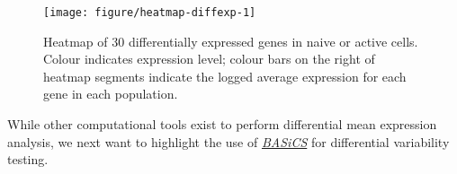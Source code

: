 \documentclass[9pt,a4paper,]{extarticle}
\begin{document}
\begin{figure}

{\centering \texttt{[image: figure/heatmap-diffexp-1]} 

}

\caption{Heatmap of 30 differentially expressed genes in naive or active cells. Colour indicates expression level; colour bars on the right of heatmap segments indicate the logged average expression for each gene in each population.}\label{fig:heatmap-diffexp}
\end{figure}

While other computational tools exist to perform differential mean expression
analysis, we next want to highlight the use of \emph{\href{https://bioconductor.org/packages/3.11/BASiCS}{BASiCS}} for
differential variability testing.

{\small}
\end{document}
